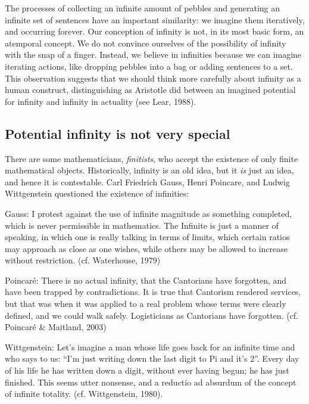   The processes of collecting an infinite amount of pebbles and generating an infinite set of sentences have an important similarity: we imagine them iteratively, and occurring forever. Our conception of infinity is not, in its most basic form, an atemporal concept. We do not convince ourselves of the possibility of infinity with the snap of a finger. Instead, we believe in infinities because we can imagine iterating actions, like dropping pebbles into a bag or adding sentences to a set. This observation suggests that we should think more carefully about infinity as a human construct, distinguishing as Aristotle did between an imagined potential for infinity and infinity in actuality (see Lear, 1988).

\subsection{Potential infinity is not very special}

There are some mathematicians, \textit{finitists}, who accept the existence of only finite mathematical objects. Historically, infinity is an old idea, but it \textit{is} just an idea, and hence it is contestable. Carl Friedrich Gauss, Henri Poincare, and Ludwig Wittgenstein questioned the existence of infinities: 

Gauss: I protest against the use of infinite magnitude as something completed, which is never permissible in mathematics. The Infinite is just a manner of speaking, in which one is really talking in terms of limits, which certain ratios may approach as close as one wishes, while others may be allowed to increase without restriction. (cf. Waterhouse, 1979)

Poincaré: There is no actual infinity, that the Cantorians have forgotten, and have been trapped by contradictions. It is true that Cantorism rendered services, but that was when it was applied to a real problem whose terms were clearly defined, and we could walk safely. Logisticians as Cantorians have forgotten. (cf. Poincaré \& Maitland, 2003) 

Wittgenstein: Let's imagine a man whose life goes back for an infinite time and who says to us: “I'm just writing down the last digit to Pi and it's 2”. Every day of his life he has written down a digit, without ever having begun; he has just finished. This seems utter nonsense, and a reductio ad absurdum of the concept of infinite totality. (cf. Wittgenstein, 1980).

